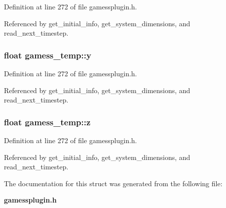 Definition at line 272 of file gamessplugin.h.

Referenced by get\_\-initial\_\-info, get\_\-system\_\-dimensions, and read\_\-next\_\-timestep.
\subsubsection{\setlength{\rightskip}{0pt plus 5cm}float gamess\_\-temp::y}\label{structgamess__temp_m3}




Definition at line 272 of file gamessplugin.h.

Referenced by get\_\-initial\_\-info, get\_\-system\_\-dimensions, and read\_\-next\_\-timestep.
\subsubsection{\setlength{\rightskip}{0pt plus 5cm}float gamess\_\-temp::z}\label{structgamess__temp_m4}




Definition at line 272 of file gamessplugin.h.

Referenced by get\_\-initial\_\-info, get\_\-system\_\-dimensions, and read\_\-next\_\-timestep.

The documentation for this struct was generated from the following file:\begin{CompactItemize}
\item 
{\bf gamessplugin.h}\end{CompactItemize}
